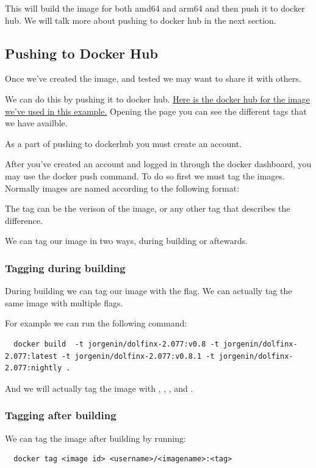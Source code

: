 \documentclass[final]{article}
\numberwithin{equation}{section}
\theoremstyle{remarkStyle}
\begin{document}
This will build the image for both amd64 and arm64 and then push it to docker hub.
We will talk more about pushing to docker hub in the next section.

\subsection{Pushing to Docker Hub}
Once we've created the image, and tested we may want to share it with others.

We can do this by pushing it to docker hub.
\href{https://hub.docker.com/repository/docker/jorgenin/dolfinx-2.077/general}{Here is the docker hub for the image we've used in this example.}
Opening the page you can see the different tags that we have availble.

As a part of pushing to dockerhub you must create an account.

After you've created an account and logged in through the docker dashboard, you may use the docker push command.
To do so first we must tag the images.
Normally images are named according to the following format:

The tag can be the verison of the image, or any other tag that describes the difference.

We can tag our image in two ways, during building or aftewards.

\subsubsection{Tagging during building}
During building we can tag our image with the  flag. We can actually tag the same image with multiple flags.

For example we can run the following command:
\begin{lstlisting}
  docker build  -t jorgenin/dolfinx-2.077:v0.8 -t jorgenin/dolfinx-2.077:latest -t jorgenin/dolfinx-2.077:v0.8.1 -t jorgenin/dolfinx-2.077:nightly .
\end{lstlisting}

And we will actually tag the image with , , , and .

\subsubsection{Tagging after building}
We can tag the image after building by running:
\begin{lstlisting}
  docker tag <image id> <username>/<imagename>:<tag>
\end{lstlisting}
\end{document}
